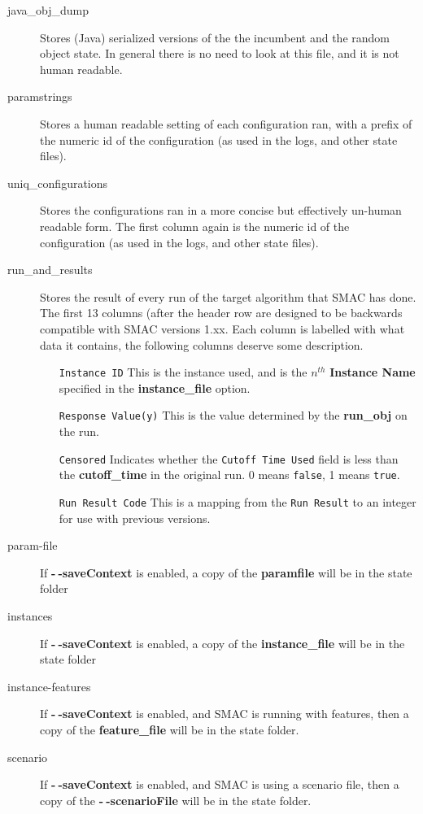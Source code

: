 \documentclass[manual.tex]{subfiles}
\begin{document}
\begin{description}
\item[java\_obj\_dump] Stores (Java) serialized versions of the the incumbent and the random object state. In general there is no need to look at this file, and it is not human readable.

\item[paramstrings]	  Stores a human readable setting of each configuration ran, with a prefix of the numeric id of the configuration (as used in the logs, and other state files).

\item[uniq\_configurations] Stores the configurations ran in a more concise but effectively un-human readable form. The first column again is the numeric id of the configuration (as used in the logs, and other state files).

\item[run\_and\_results] Stores the result of every run of the target algorithm that SMAC has done. The first 13 columns (after the header row are designed to be backwards compatible with SMAC versions 1.xx. Each column is labelled with what data it contains, the following columns deserve some description.
	\begin{enumerate}
	\item[\texttt{Instance ID}]	This is the instance used, and is the $n^{th}$ \textbf{Instance Name} specified in the \textbf{instance\_file} option.
	\item[\texttt{Response Value(y)}]  This is the value determined by the \textbf{run\_obj} on the run.
	\item[\texttt{Censored}] Indicates whether the \texttt{Cutoff Time Used} field is less than the \textbf{cutoff\_time} in the original run. 0 means \texttt{false}, 1 means \texttt{true}.
	\item[\texttt{Run Result Code}]	This is a mapping from the \texttt{Run Result} to an integer for use with previous versions.
	\end{enumerate}
	
	\item[param-file] If \textbf{-$~\!$-saveContext} is enabled, a copy of the \textbf{paramfile} will be in the state folder 
	
	\item[instances] If \textbf{-$~\!$-saveContext} is enabled, a copy of the \textbf{instance\_file} will be in the state folder 
	
	\item[instance-features] If \textbf{-$~\!$-saveContext} is enabled, and SMAC is running with features, then a copy of the \textbf{feature\_file} will be in the state folder.

	\item[scenario] If \textbf{-$~\!$-saveContext} is enabled, and SMAC is using a scenario file, then a copy of the  \textbf{-$~\!$-scenarioFile} will be in the state folder.
	
	
		
	
\end{description}
\end{document}
